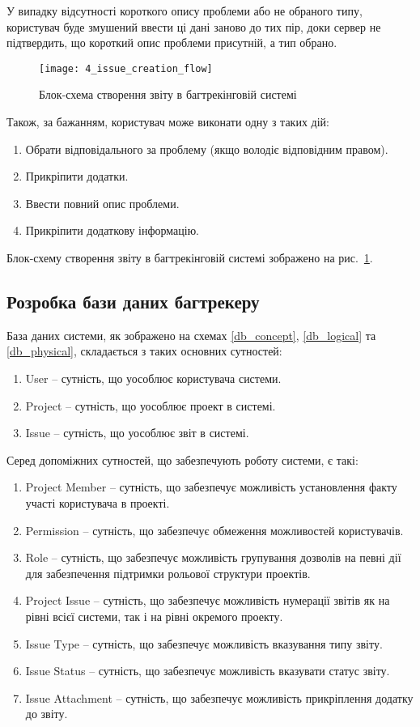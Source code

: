 \documentclass[../main.tex]{subfiles}
\begin{document}
			У випадку відсутності короткого опису проблеми або не обраного типу, користувач буде змушений ввести ці дані заново до тих пір, доки сервер не підтвердить, що короткий опис проблеми присутній, а тип обрано.
			
			\begin{figure}[H]
				\centering
				\texttt{[image: 4\_issue\_creation\_flow]}
				\caption{Блок-схема створення звіту в багтрекінговій системі}
				\label{flowchart_issue_creation}
			\end{figure}
			
			Також, за бажанням, користувач може виконати одну з таких дій:
			\begin{enumerate}
				\item Обрати відповідального за проблему (якщо володіє відповідним правом).
				\item Прикріпити додатки.
				\item Ввести повний опис проблеми.
				\item Прикріпити додаткову інформацію.
			\end{enumerate}
			
			Блок-схему створення звіту в багтрекінговій системі зображено на рис.~\ref{flowchart_issue_creation}.

	\subsection{Розробка бази даних багтрекеру}
		База даних системи, як зображено на схемах \ref{db_concept}, \ref{db_logical} та \ref{db_physical}, складається з таких основних сутностей:
		\begin{enumerate}
			\item User -- сутність, що уособлює користувача системи.
			\item Project -- сутність, що уособлює проект в системі.
			\item Issue -- сутність, що уособлює звіт в системі.
		\end{enumerate}
		
		Серед допоміжних сутностей, що забезпечують роботу системи, є такі:
		\begin{enumerate}
			\item Project Member -- сутність, що забезпечує можливість установлення факту участі користувача в проекті.
			\item Permission -- сутність, що забезпечує обмеження можливостей користувачів.
			\item Role -- сутність, що забезпечує можливість групування дозволів на певні дії для забезпечення підтримки рольової структури проектів.
			\item Project Issue -- сутність, що забезпечує можливість нумерації звітів як на рівні всієї системи, так і на рівні окремого проекту.
			\item Issue Type -- сутність, що забезпечує можливість вказування типу звіту.
			\item Issue Status -- сутність, що забезпечує можливість вказувати статус звіту.
			\item Issue Attachment -- сутність, що забезпечує можливість прикріплення додатку до звіту.
		\end{enumerate}
		
\end{document}
